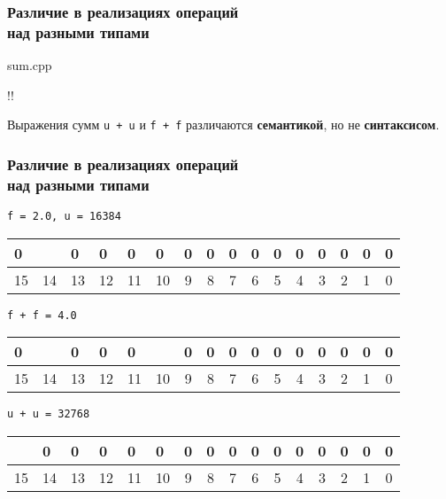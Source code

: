 \documentclass[compress, 8pt]{beamer}
\newenvironment{sixteenbit}{%
    \begin{center}
        \begin{tabular}{ |m{0.2cm}|m{0.2cm}|m{0.2cm}|m{0.2cm}|m{0.2cm}|m{0.2cm}|m{0.2cm}|m{0.2cm}|m{0.2cm}|m{0.2cm}|m{0.2cm}|m{0.2cm}|m{0.2cm}|m{0.2cm}|m{0.2cm}|m{0.2cm}|  }
            \hline
}{
        \hline
        \multicolumn{1}{c}{\color{gray}\tiny{15}} &
        \multicolumn{1}{c}{\color{gray}\tiny{14}} &
        \multicolumn{1}{c}{\color{gray}\tiny{13}} &
        \multicolumn{1}{c}{\color{gray}\tiny{12}} &
        \multicolumn{1}{c}{\color{gray}\tiny{11}} &
        \multicolumn{1}{c}{\color{gray}\tiny{10}} &
        \multicolumn{1}{c}{\color{gray}\tiny{9}} &
        \multicolumn{1}{c}{\color{gray}\tiny{8}} &
        \multicolumn{1}{c}{\color{gray}\tiny{7}} &
        \multicolumn{1}{c}{\color{gray}\tiny{6}} &
        \multicolumn{1}{c}{\color{gray}\tiny{5}} &
        \multicolumn{1}{c}{\color{gray}\tiny{4}} &
        \multicolumn{1}{c}{\color{gray}\tiny{3}} &
        \multicolumn{1}{c}{\color{gray}\tiny{2}} &
        \multicolumn{1}{c}{\color{gray}\tiny{1}} &
        \multicolumn{1}{c}{\color{gray}\tiny{0}} \\
        \end{tabular}
    \end{center}
}
\begin{document}
\begin{frame}[fragile]

    \frametitle{Различие в реализациях операций \\ над разными типами}

        {sum.cpp}

    \begin{terminalwindow}
!!
    \end{terminalwindow}

    Выражения сумм \verb|u + u| и \verb|f + f| различаются
    \textbf{семантикой}, но не \textbf{синтаксисом}.

\end{frame}

\begin{frame}[fragile]

    \frametitle{Различие в реализациях операций \\ над разными типами}

    \verb|f = 2.0, u = 16384|

    \begin{sixteenbit}
        0 & \cellcolor{gray}{1} & 0 & 0 & 0 & 0 & 0 & 0 & 0 & 0 & 0 & 0 & 0 & 0 & 0 & 0 \\
    \end{sixteenbit}

    \verb|f + f = 4.0|

    \begin{sixteenbit}
        0 & \cellcolor{gray}{1} & 0 & 0 & 0 & \cellcolor{gray}{1} & 0 & 0 & 0 & 0 & 0 & 0 & 0 & 0 & 0 & 0 \\
    \end{sixteenbit}

    \verb|u + u = 32768|

    \begin{sixteenbit}
        \cellcolor{gray}{1} & 0 & 0 & 0 & 0 & 0 & 0 & 0 & 0 & 0 & 0 & 0 & 0 & 0 & 0 & 0 \\
    \end{sixteenbit}

\end{frame}
\end{document}
